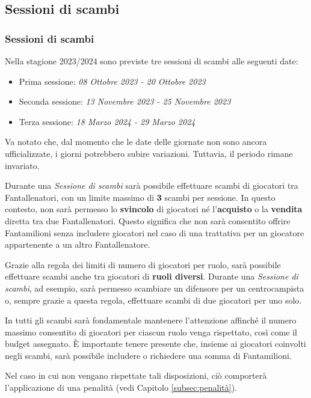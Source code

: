 \documentclass[12pt]{article}
\begin{document}
\subsection{Sessioni di scambi}\label{subsec:sessioni-scambi}

\subsubsection{Sessioni di scambi}
Nella stagione 2023/2024 sono previste tre sessioni di scambi alle seguenti date:

\begin{itemize}
    \item Prima sessione: \textit{08 Ottobre 2023 - 20 Ottobre 2023}
    \item Seconda sessione: \textit{13 Novembre 2023 - 25 Novembre 2023}
    \item Terza sessione: \textit{18 Marzo 2024 - 29 Marzo 2024}
\end{itemize}

Va notato che, dal momento che le date delle giornate non sono ancora ufficializzate, i giorni potrebbero subire variazioni. Tuttavia, il periodo rimane invariato.

Durante una \textit{Sessione di scambi} sarà possibile effettuare scambi di giocatori tra Fantallenatori, con un limite massimo di \textbf{3} scambi per sessione. In questo contesto, non sarà permesso lo \textbf{svincolo} di giocatori né l'\textbf{acquisto} o la \textbf{vendita} diretta tra due Fantallenatori. Questo significa che non sarà consentito offrire Fantamilioni senza includere giocatori nel caso di una trattativa per un giocatore appartenente a un altro Fantallenatore.

Grazie alla regola dei limiti di numero di giocatori per ruolo, sarà possibile effettuare scambi anche tra giocatori di \textbf{ruoli diversi}. Durante una \textit{Sessione di scambi}, ad esempio, sarà permesso scambiare un difensore per un centrocampista o, sempre grazie a questa regola, effettuare scambi di due giocatori per uno solo.

In tutti gli scambi sarà fondamentale mantenere l'attenzione affinché il numero massimo consentito di giocatori per ciascun ruolo venga rispettato, così come il budget assegnato. È importante tenere presente che, insieme ai giocatori coinvolti negli scambi, sarà possibile includere o richiedere una somma di Fantamilioni.

Nel caso in cui non vengano rispettate tali disposizioni, ciò comporterà l'applicazione di una penalità (vedi Capitolo \ref{subsec:penalità}).
\end{document}

